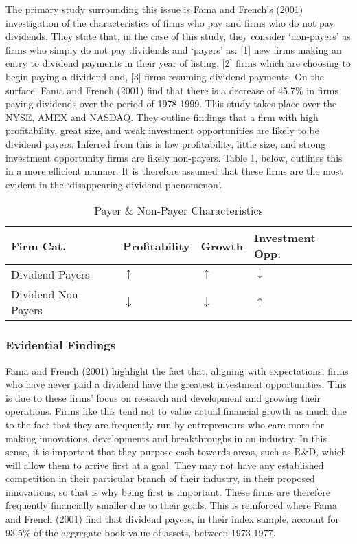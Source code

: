 \documentclass[11pt, english]{article}
\begin{document}
	The primary study surrounding this issue is Fama and French’s (2001) investigation of the characteristics of firms who pay and firms who do not pay dividends. They state that, in the case of this study, they consider `non-payers' as firms who simply do not pay dividends and `payers' as: [1] new firms making an entry to dividend payments in their year of listing, [2] firms which are choosing to begin paying a dividend and, [3] firms resuming dividend payments. On the surface, Fama and French (2001) find that there is a decrease of 45.7\% in firms paying dividends over the period of 1978-1999. This study takes place over the NYSE, AMEX and NASDAQ. They outline findings that a firm with high profitability, great size, and weak investment opportunities are likely to be dividend payers. Inferred from this is low profitability, little size, and strong investment opportunity firms are likely non-payers. Table 1, below, outlines this in a more efficient manner. It is therefore assumed that these firms are the most evident in the `disappearing dividend phenomenon'.\\

	\begin{table}[h]
		\scriptsize
	\begin{center}
	\begin{tabular}{p{3.5cm}p{2.5cm}p{2.5cm}p{2.5cm}}
		\textbf{Firm Cat.} & \textbf{Profitability} & \textbf{Growth} & \textbf{Investment Opp.}\\
		\hline
		Dividend Payers & $\uparrow$ & $\uparrow$ & $\downarrow$\\
		Dividend Non-Payers & $\downarrow$ & $\downarrow$ & $\uparrow$\\
		\hline
	\end{tabular}
		\caption{Payer \& Non-Payer Characteristics}
	\end{center}
	\end{table}

		\newpage

		\subsubsection*{Evidential Findings}

	Fama and French (2001) highlight the fact that, aligning with expectations, firms who have never paid a dividend have the greatest investment opportunities. This is due to these firms’ focus on research and development and growing their operations. Firms like this tend not to value actual financial growth as much due to the fact that they are frequently run by entrepreneurs who care more for making innovations, developments and breakthroughs in an industry. In this sense, it is important that they purpose cash towards areas, such as R\&D, which will allow them to arrive first at a goal. They may not have any established competition in their particular branch of their industry, in their proposed innovations, so that is why being first is important. These firms are therefore frequently financially smaller due to their goals. This is reinforced where Fama and French (2001) find that dividend payers, in their index sample, account for 93.5\% of the aggregate book-value-of-assets, between 1973-1977.\\
\end{document}
